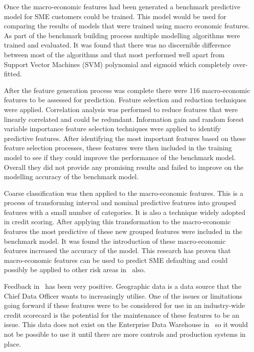 Once the macro-economic features had been generated a benchmark  predictive model for SME customers could be trained. This model would be used for comparing the results of models that were trained using macro economic features. As part of the benchmark building process multiple modelling algorithms were trained and evaluated. It was found that there was no discernible difference between most of the algorithms and that most performed well apart from Support Vector Machines (SVM) polynomial and sigmoid which completely over-fitted.  

After the feature generation process was complete there were 116 macro-economic features to be assessed for prediction. Feature selection and reduction techniques were applied. Correlation analysis was performed to reduce features that were linearly correlated and could be redundant. Information gain and random forest variable importance feature selection techniques were applied to identify predictive features. After identifying the most important features based on these feature selection processes, these features were then included in the training model to see if they could improve the performance of the benchmark model. Overall they did not provide any promising results and failed to improve on the modelling accuracy of the benchmark model.

Coarse classification was then applied to the macro-economic features. This is a process of transforming interval and nominal predictive features into grouped features with a small number of categories. It is also a technique widely adopted in credit scoring. After applying this transformation to the macro-economic features the most predictive of these new grouped features were included in the benchmark model. It was found the introduction of these macro-economic features increased the accuracy of the model. This research has proven that macro-economic features can be used to predict SME defaulting and could possibly be applied to other risk areas in \subjectname\ also.

Feedback in \subjectname\ has been very positive. Geographic data is a data source that the Chief Data Officer wants to increasingly utilise. One of the issues or limitations going forward if these features were to be considered for use in an industry-wide credit scorecard is the potential for the maintenance of these features to be an issue. This data does not exist on the Enterprise Data Warehouse in \subjectname\ so it would not be possible to use it until there are more controls and production systems in place. 



